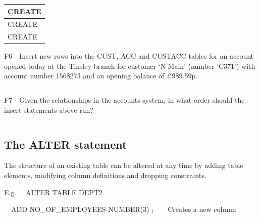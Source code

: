 \begin{flushleft}
\tablefirsthead{}
\tablehead{}
\tabletail{}
\tablelasttail{}
\begin{supertabular}{|m{14.663cm}|}
\hline
CREATE

\\\hline
CREATE

\\\hline
CREATE

\\\hline
\end{supertabular}
\end{flushleft}
F6\ \ Insert new rows into the CUST, ACC and CUSTACC tables for an account opened today at the Tinsley branch for customer  {}`N Main' (number 'C371') with account number 1568273 and an opening balance of £989.59p.

\begin{flushleft}
\tablefirsthead{}
\tablehead{}
\tabletail{}
\tablelasttail{}
\begin{supertabular}{|m{14.663cm}|}
\hline
\\\hline
\end{supertabular}
\end{flushleft}
F7\ \ Given the relationships in the accounts system, in what order should the insert statements above run?

\begin{flushleft}
\tablefirsthead{}
\tablehead{}
\tabletail{}
\tablelasttail{}
\begin{supertabular}{|m{14.663cm}|}
\hline
\\\hline
\end{supertabular}
\end{flushleft}
\subsection{}
\subsection{}
\subsection{The ALTER statement}
The structure of an existing table can be altered at any time by adding table elements, modifying column definitions and dropping constraints.

E.g. \ \ ALTER TABLE DEPT2

\ \ ADD NO\_OF\_EMPLOYEES NUMBER(3) ;\ \ \ \ Creates a new column

